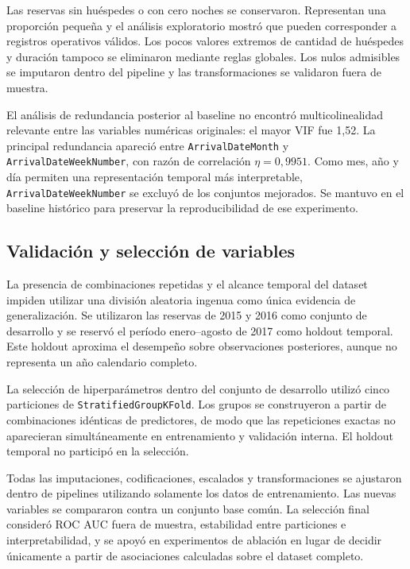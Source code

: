 Las reservas sin huéspedes o con cero noches se conservaron. Representan una
proporción pequeña y el análisis exploratorio mostró que pueden corresponder a
registros operativos válidos. Los pocos valores extremos de cantidad de
huéspedes y duración tampoco se eliminaron mediante reglas globales. Los nulos
admisibles se imputaron dentro del pipeline y las transformaciones se validaron
fuera de muestra.

El análisis de redundancia posterior al baseline no encontró multicolinealidad
relevante entre las variables numéricas originales: el mayor VIF fue 1,52. La
principal redundancia apareció entre \texttt{ArrivalDateMonth} y
\texttt{ArrivalDateWeekNumber}, con razón de correlación
$\eta=0{,}9951$. Como mes, año y día permiten una representación temporal más
interpretable, \texttt{ArrivalDateWeekNumber} se excluyó de los conjuntos
mejorados. Se mantuvo en el baseline histórico para preservar la
reproducibilidad de ese experimento.

\subsection{Validación y selección de variables}

La presencia de combinaciones repetidas y el alcance temporal del dataset
impiden utilizar una división aleatoria ingenua como única evidencia de
generalización. Se utilizaron las reservas de 2015 y 2016 como conjunto de
desarrollo y se reservó el período enero--agosto de 2017 como holdout temporal.
Este holdout aproxima el desempeño sobre observaciones posteriores, aunque no
representa un año calendario completo.

La selección de hiperparámetros dentro del conjunto de desarrollo utilizó
cinco particiones de \texttt{StratifiedGroupKFold}. Los grupos se construyeron
a partir de combinaciones idénticas de predictores, de modo que las
repeticiones exactas no aparecieran simultáneamente en entrenamiento y
validación interna. El holdout temporal no participó en la selección.

Todas las imputaciones, codificaciones, escalados y transformaciones se
ajustaron dentro de pipelines utilizando solamente los datos de entrenamiento.
Las nuevas variables se compararon contra un conjunto base común. La selección
final consideró ROC AUC fuera de muestra, estabilidad entre particiones e
interpretabilidad, y se apoyó en experimentos de ablación en lugar de
decidir únicamente a partir de asociaciones calculadas sobre el dataset
completo.


